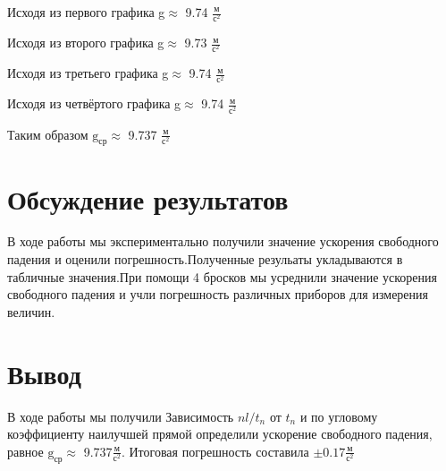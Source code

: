 \documentclass[a4paper, 10pt]{article}%
\begin{document}
Исходя из первого графика g$\approx$ 9.74 $\frac{\text{м}}{\text{с}^2}$

Исходя из второго графика g$\approx$ 9.73 $\frac{\text{м}}{\text{с}^2}$

Исходя из третьего графика g$\approx$ 9.74 $\frac{\text{м}}{\text{с}^2}$

Исходя из четвёртого графика g$\approx$ 9.74 $\frac{\text{м}}{\text{с}^2}$

Таким образом $\text{g}_\text{ср} \approx$ 9.737 $\frac{\text{м}}{\text{с}^2}$

\section{Обсуждение результатов}
В ходе работы мы экспериментально получили значение ускорения свободного падения и оценили погрешность.Полученные резульаты укладываются в табличные значения.При помощи 4 бросков мы усреднили значение ускорения свободного падения и учли погрешность различных приборов для измерения величин.

\section{Вывод}
В ходе работы мы получили Зависимость $nl/t_{n}$ \hspace{3pt} от \hspace{3pt}$t_{n}$ и по угловому коэффициенту наилучшей прямой определили ускорение свободного падения, равное $\text{g}_\text{ср} \approx$ 9.737$\frac{\text{м}}{\text{с}^2}$. Итоговая погрешность составила $\pm 0.17 \frac{\text{м}}{\text{с}^2}$
\end{document}
